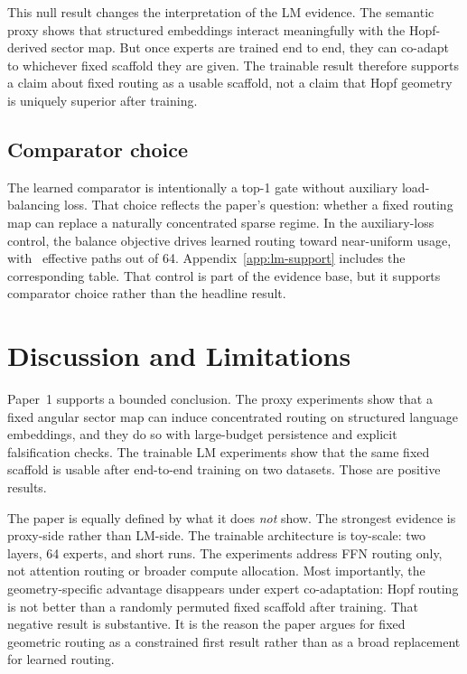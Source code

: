 \documentclass[11pt,letterpaper]{article}
\begin{document}
This null result changes the interpretation of the LM evidence. The semantic proxy shows that structured embeddings interact meaningfully with the Hopf-derived sector map. But once experts are trained end to end, they can co-adapt to whichever fixed scaffold they are given. The trainable result therefore supports a claim about fixed routing as a usable scaffold, not a claim that Hopf geometry is uniquely superior after training.

\subsection{Comparator choice}
The learned comparator is intentionally a top-1 gate without auxiliary load-balancing loss. That choice reflects the paper's question: whether a fixed routing map can replace a naturally concentrated sparse regime. In the auxiliary-loss control, the balance objective drives learned routing toward near-uniform usage, with \PaperAuxSparseEff\ effective paths out of 64. Appendix~\ref{app:lm-support} includes the corresponding table. That control is part of the evidence base, but it supports comparator choice rather than the headline result.

\section{Discussion and Limitations}
Paper~1 supports a bounded conclusion. The proxy experiments show that a fixed angular sector map can induce concentrated routing on structured language embeddings, and they do so with large-budget persistence and explicit falsification checks. The trainable LM experiments show that the same fixed scaffold is usable after end-to-end training on two datasets. Those are positive results.

The paper is equally defined by what it does \emph{not} show. The strongest evidence is proxy-side rather than LM-side. The trainable architecture is toy-scale: two layers, 64 experts, and short runs. The experiments address FFN routing only, not attention routing or broader compute allocation. Most importantly, the geometry-specific advantage disappears under expert co-adaptation: Hopf routing is not better than a randomly permuted fixed scaffold after training. That negative result is substantive. It is the reason the paper argues for fixed geometric routing as a constrained first result rather than as a broad replacement for learned routing.
\end{document}
